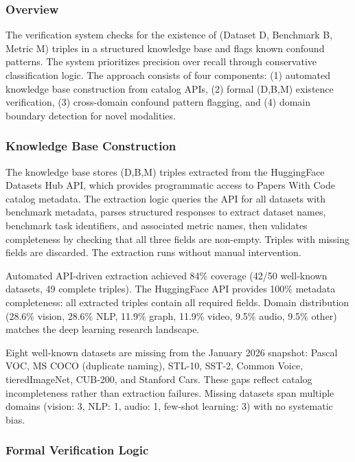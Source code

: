
\subsubsection{Overview}

The verification system checks for the existence of (Dataset D, Benchmark B, Metric M) triples in a structured knowledge base and flags known confound patterns. The system prioritizes precision over recall through conservative classification logic. The approach consists of four components: (1) automated knowledge base construction from catalog APIs, (2) formal (D,B,M) existence verification, (3) cross-domain confound pattern flagging, and (4) domain boundary detection for novel modalities.

\subsubsection{Knowledge Base Construction}

The knowledge base stores (D,B,M) triples extracted from the HuggingFace Datasets Hub API, which provides programmatic access to Papers With Code catalog metadata. The extraction logic queries the API for all datasets with benchmark metadata, parses structured responses to extract dataset names, benchmark task identifiers, and associated metric names, then validates completeness by checking that all three fields are non-empty. Triples with missing fields are discarded. The extraction runs without manual intervention.

Automated API-driven extraction achieved 84\% coverage (42/50 well-known datasets, 49 complete triples). The HuggingFace API provides 100\% metadata completeness: all extracted triples contain all required fields. Domain distribution (28.6\% vision, 28.6\% NLP, 11.9\% graph, 11.9\% video, 9.5\% audio, 9.5\% other) matches the deep learning research landscape.

Eight well-known datasets are missing from the January 2026 snapshot: Pascal VOC, MS COCO (duplicate naming), STL-10, SST-2, Common Voice, tieredImageNet, CUB-200, and Stanford Cars. These gaps reflect catalog incompleteness rather than extraction failures. Missing datasets span multiple domains (vision: 3, NLP: 1, audio: 1, few-shot learning: 3) with no systematic bias.

\subsubsection{Formal Verification Logic}

